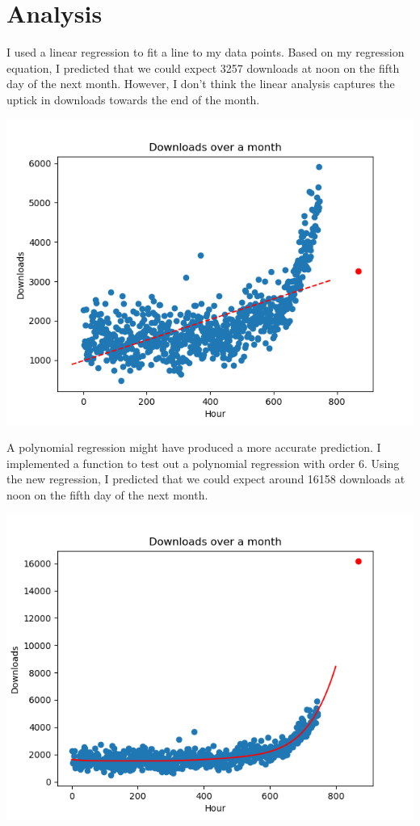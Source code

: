 \documentclass{article}
\begin{document}
\section{Analysis}

I used a linear regression to fit a line to my data points. Based on my regression equation, I predicted that we could expect 3257 downloads at noon on the fifth day of the next month. However, I don't think the linear analysis captures the uptick in downloads towards the end of the month.

\includegraphics[scale=0.6]{linear_regression_prediction.png}

A polynomial regression might have produced a more accurate prediction. I implemented a function to test out a  polynomial regression with order 6. Using the new regression, I predicted that we could expect around 16158 downloads at noon on the fifth day of the next month.

\includegraphics[scale=0.6]{polynomial_regression_deg6.png}
\end{document}
